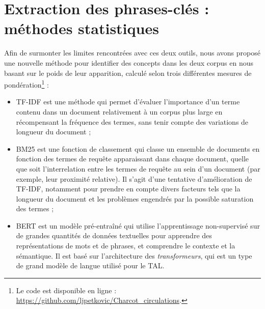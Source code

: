











\section{Extraction des phrases-clés : méthodes statistiques}
\label{sect:methodo_stat}
Afin de surmonter les limites rencontrées avec ces deux outils, nous avons proposé une nouvelle méthode pour identifier des concepts dans les deux corpus en nous basant sur le poids de leur apparition, calculé selon trois différentes mesures de pondération\footnote{Le code est disponible en ligne : \url{https://github.com/ljpetkovic/Charcot\_circulations}.} :
\begin{itemize}
\item \textsc{TF-IDF} est une méthode qui permet d'évaluer l'importance d'un terme contenu dans un document relativement à un corpus plus large en récompensant la fréquence des termes, sans tenir compte des variations de longueur du document ;
\item \textsc{BM25} est une fonction de classement qui classe un ensemble de documents en fonction des termes de requête apparaissant dans chaque document, quelle que soit l'interrelation entre les termes de requête au sein d'un document (par exemple, leur proximité relative). Il s'agit d'une tentative d'amélioration de \textsc{TF-IDF}, notamment pour prendre en compte divers facteurs tels que la longueur du document et les problèmes engendrés par la possible saturation des termes \citep[p.~355]{robertson2009probabilistic} ;
\item \textsc{BERT} \citep{devlin2019} est un modèle pré-entraîné qui utilise l'apprentissage non-supervisé sur de grandes quantités de données textuelles pour apprendre des représentations de mots et de phrases, et comprendre le contexte et la sémantique. Il est basé sur l'architecture des \textit{transformeurs}, qui est un type de grand modèle de langue utilisé pour le \textsc{TAL}.
\end{itemize}

